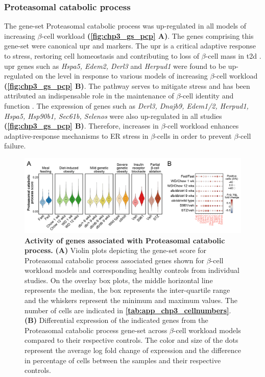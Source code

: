\subsubsection{Proteasomal catabolic process}
The gene-set Proteasomal catabolic process was up-regulated in all models of increasing $\beta$-cell workload \textbf{(\autoref{fig:chp3_gs_pcp} A)}. The genes comprising this gene-set were canonical \gls{upr} and  markers. The \gls{upr} is a critical adaptive response to  stress, restoring cell homeostasis and contributing to loss of $\beta$-cell mass in \gls{t2d} \textbf{\cite{oppenlander_vertical_2021,fonseca_endoplasmic_2011,bilekova_pharmacological_2021}}. \gls{upr} genes such as \textit{Hspa5, Edem2, Derl3} and \textit{Herpud1} were found to be up-regulated on the  level in response to various models of increasing $\beta$-cell workload \textbf{(\autoref{fig:chp3_gs_pcp} B)}. The  pathway serves to mitigate  stress and has been attributed an indispensable role in the maintenance of $\beta$-cell identity and function \textbf{\cite{oppenlander_vertical_2021,hu_endoplasmic_2019,shrestha_sel1l-hrd1_2020}}. The expression of  genes such as \textit{Derl3, Dnajb9, Edem1/2, Herpud1, Hspa5, Hsp90b1, Sec61b, Selenos} were also up-regulated in all studies \textbf{(\autoref{fig:chp3_gs_pcp} B)}. Therefore, increases in $\beta$-cell workload enhances adaptive-response mechanisms to ER stress in $\beta$-cells in order to prevent $\beta$-cell failure. 

\begin{figure}[H]
\centering
\includegraphics[width=\linewidth]{Chapter5/Fig/F3-13-04.png}
\caption[Activity of genes associated with proteasomal catabolic process]{\textbf{Activity of genes associated with Proteasomal catabolic process.} \textbf{(A)} Violin plots depicting the gene-set score for Proteasomal catabolic process associated genes shown for $\beta$-cell workload models and corresponding healthy controls from individual studies. On the overlay box plots, the middle horizontal line represents the median, the box represents the inter-quartile range and the whiskers represent the minimum and maximum values. The number of cells are indicated in \textbf{\autoref{tab:app_chp3_cellnumbers}}. \textbf{(B)} Differential expression of the indicated genes from the Proteasomal catabolic process gene-set across $\beta$-cell workload models compared to their respective controls. The color and size of the dots represent the average log fold change of expression and the difference in percentage of cells between the samples and their respective controls.}
\label{fig:chp3_gs_pcp}
\end{figure}


